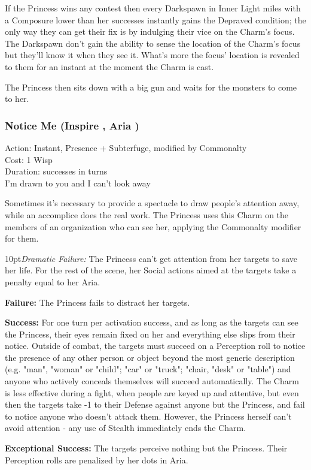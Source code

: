 If the Princess wins any contest then every Darkspawn in Inner Light miles with a Composure lower than her successes instantly gains the Depraved condition; the only way they can get their fix is by indulging their vice on the Charm's focus. The Darkspawn don't gain the ability to sense the location of the Charm's focus but they'll know it when they see it. What's more the focus' location is revealed to them for an instant at the moment the Charm is cast.

The Princess then sits down with a big gun and waits for the monsters to come to her. 

\subsubsection*{Notice Me (Inspire \textbullet\textbullet\textbullet, Aria \textbullet\textbullet)}
\noindent Action: Instant, Presence + Subterfuge, modified by Commonalty\\

\noindent Cost: 1 Wisp\\

\noindent Duration: successes in turns\\

\noindent I'm drawn to you and I can't look away

Sometimes it's necessary to provide a spectacle to draw people's attention away, while an accomplice does the real work. The Princess uses this Charm on the members of an organization who can see her, applying the Commonalty modifier for them.

\begin{myindentpar}{10pt}\emph{Dramatic Failure:} The Princess can't get attention from her targets to save her life. For the rest of the scene, her Social actions aimed at the targets take a penalty equal to her Aria.

\textbf{Failure:} The Princess fails to distract her targets.

\textbf{Success:} For one turn per activation success, and as long as the targets can see the Princess, their eyes remain fixed on her and everything else slips from their notice. Outside of combat, the targets must succeed on a Perception roll to notice the presence of any other person or object beyond the most generic description (e.g. "man", "woman" or "child"; "car" or "truck"; "chair, "desk" or "table") and anyone who actively conceals themselves will succeed automatically. The Charm is less effective during a fight, when people are keyed up and attentive, but even then the targets take -1 to their Defense against anyone but the Princess, and fail to notice anyone who doesn't attack them. However, the Princess herself can't avoid attention - any use of Stealth immediately ends the Charm.

\textbf{Exceptional Success:} The targets perceive nothing but the Princess. Their Perception rolls are penalized by her dots in Aria.\end{myindentpar}

